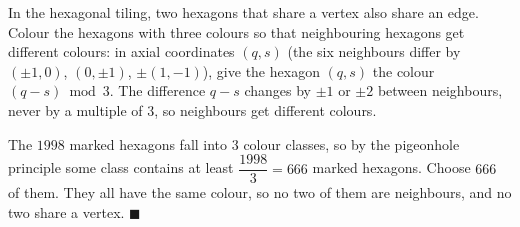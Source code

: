In the hexagonal tiling, two hexagons that share a vertex also share an edge. Colour the hexagons with three colours so that neighbouring hexagons get different colours: in axial coordinates $(q,s)$ (the six neighbours differ by $(\pm1,0)$, $(0,\pm1)$, $\pm(1,-1)$), give the hexagon $(q,s)$ the colour $(q-s)\bmod3$. The difference $q-s$ changes by $\pm1$ or $\pm2$ between neighbours, never by a multiple of $3$, so neighbours get different colours.

The $1998$ marked hexagons fall into $3$ colour classes, so by the pigeonhole principle some class contains at least $\dfrac{1998}{3}=666$ marked hexagons. Choose $666$ of them. They all have the same colour, so no two of them are neighbours, and no two share a vertex. $\blacksquare$
